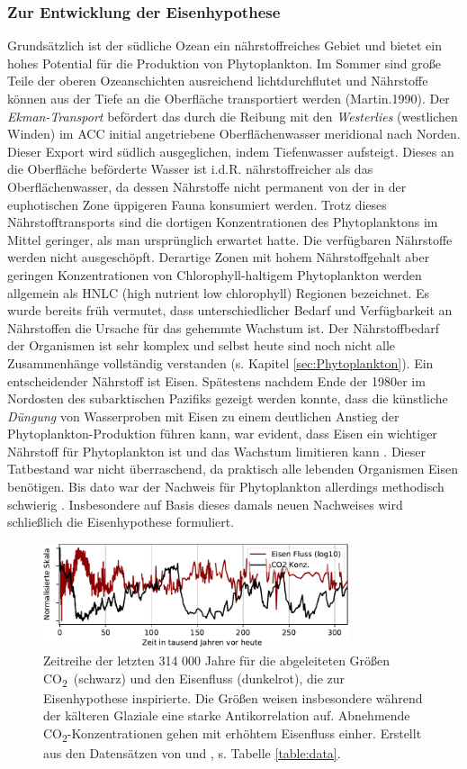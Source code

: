\documentclass[12pt,a4paper,onecolumn]{scrartcl}
\newcommand{\cotwo}{CO\textsubscript{2}}
\begin{document}
\subsubsection{Zur Entwicklung der Eisenhypothese}
Grundsätzlich ist der südliche Ozean ein nährstoffreiches Gebiet und
bietet ein hohes Potential für die Produktion von Phytoplankton. Im Sommer sind große Teile der oberen Ozeanschichten ausreichend lichtdurchflutet und Nährstoffe können aus der Tiefe an die Oberfläche transportiert werden (Martin.1990). Der \textit{Ekman-Transport} befördert das durch die Reibung mit den \textit{Westerlies} (westlichen Winden) im ACC initial angetriebene Oberflächenwasser meridional nach Norden. Dieser Export wird südlich ausgeglichen, indem Tiefenwasser aufsteigt. Dieses an die Oberfläche beförderte Wasser ist i.d.R. nährstoffreicher als das Oberflächenwasser, da dessen Nährstoffe nicht permanent von der in der euphotischen Zone üppigeren Fauna konsumiert werden. Trotz dieses Nährstofftransports sind die dortigen Konzentrationen des Phytoplanktons im Mittel geringer, als man ursprünglich erwartet hatte. Die verfügbaren Nährstoffe werden nicht ausgeschöpft. Derartige Zonen mit hohem Nährstoffgehalt aber geringen Konzentrationen von Chlorophyll-haltigem Phytoplankton werden allgemein als HNLC (high nutrient low chlorophyll) Regionen bezeichnet. Es wurde bereits früh vermutet, dass unterschiedlicher Bedarf und Verfügbarkeit an Nährstoffen die Ursache für das gehemmte Wachstum ist. Der Nährstoffbedarf der Organismen ist sehr komplex und selbst heute sind noch nicht alle Zusammenhänge vollständig verstanden (s. Kapitel \ref{sec:Phytoplankton}). Ein entscheidender Nährstoff ist Eisen. Spätestens nachdem Ende der 1980er im Nordosten des subarktischen Pazifiks gezeigt werden konnte, dass die künstliche \textit{Düngung} von Wasserproben mit Eisen zu einem deutlichen Anstieg der Phytoplankton-Produktion führen kann, war evident, dass Eisen ein wichtiger Nährstoff für Phytoplankton ist und das Wachstum limitieren kann \citep{Martin.1988}. Dieser Tatbestand war nicht überraschend, da praktisch alle lebenden Organismen Eisen benötigen. Bis dato war der Nachweis für Phytoplankton allerdings methodisch schwierig \citep{Martin.1988}. Insbesondere auf Basis dieses damals neuen Nachweises wird schließlich die Eisenhypothese formuliert.
\begin{figure}[!htb]
\centering
\includegraphics[width=0.8\textwidth]{bilder/co2_iron.pdf}
\caption{Zeitreihe der letzten 314 000 Jahre für die abgeleiteten Größen \cotwo \ (schwarz) und den Eisenfluss (dunkelrot), die zur Eisenhypothese inspirierte. Die Größen weisen insbesondere während der kälteren Glaziale eine starke Antikorrelation auf. Abnehmende \cotwo -Konzentrationen gehen mit erhöhtem Eisenfluss einher. Erstellt aus den Datensätzen von \cite{Bereiter.2015} und \cite{Vallelonga.2013}, s. Tabelle \ref{table:data}.}   \label{fig:co2iron}
\end{figure}
\end{document}
